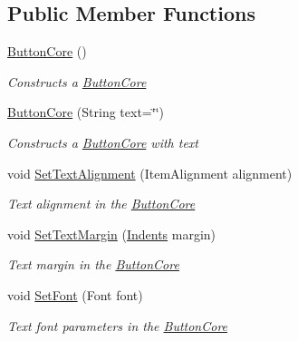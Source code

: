 \subsection*{Public Member Functions}
\begin{DoxyCompactItemize}
\item 
\mbox{\hyperlink{class_space_v_i_l_1_1_button_core_ab1139f0c4796d74ef4444f79626d751c}{Button\+Core}} ()
\begin{DoxyCompactList}\small\item\em Constructs a \mbox{\hyperlink{class_space_v_i_l_1_1_button_core}{Button\+Core}} \end{DoxyCompactList}\item 
\mbox{\hyperlink{class_space_v_i_l_1_1_button_core_af14e7efaa232a4ce2685fad35b6d691a}{Button\+Core}} (String text=\char`\"{}\char`\"{})
\begin{DoxyCompactList}\small\item\em Constructs a \mbox{\hyperlink{class_space_v_i_l_1_1_button_core}{Button\+Core}} with text \end{DoxyCompactList}\item 
void \mbox{\hyperlink{class_space_v_i_l_1_1_button_core_ae7f849e629f8bd356608066de26f9996}{Set\+Text\+Alignment}} (Item\+Alignment alignment)
\begin{DoxyCompactList}\small\item\em Text alignment in the \mbox{\hyperlink{class_space_v_i_l_1_1_button_core}{Button\+Core}} \end{DoxyCompactList}\item 
void \mbox{\hyperlink{class_space_v_i_l_1_1_button_core_ad1d215401ec59acf1c54cfa036606b0f}{Set\+Text\+Margin}} (\mbox{\hyperlink{struct_space_v_i_l_1_1_decorations_1_1_indents}{Indents}} margin)
\begin{DoxyCompactList}\small\item\em Text margin in the \mbox{\hyperlink{class_space_v_i_l_1_1_button_core}{Button\+Core}} \end{DoxyCompactList}\item 
void \mbox{\hyperlink{class_space_v_i_l_1_1_button_core_a7689c84be1b1b152a07186a32a08f273}{Set\+Font}} (Font font)
\begin{DoxyCompactList}\small\item\em Text font parameters in the \mbox{\hyperlink{class_space_v_i_l_1_1_button_core}{Button\+Core}} \end{DoxyCompactList}\item 
\mbox{\label{class_space_v_i_l_1_1_button_core_a9ad35157c53a54959d8ccd189c0f00c6}} 

\end{DoxyCompactItemize}
